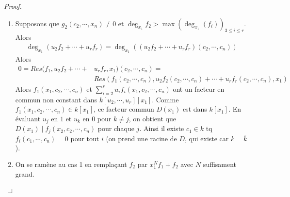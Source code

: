 \begin{proof}
                    \begin{enumerate}
                        \item Supposons que $g_2(c_2, \cdots, x_n) \neq 0$ et $\deg_{x_1} f_2 > \max(\deg_{x_1}(f_i))_{3 \leq i \leq r}$. Alors
                        \begin{align*}
                            \deg_{x_1}(u_2f_2 + \cdots + u_rf_r) = \deg_{x_1}((u_2f_2 + \cdots + u_rf_r)(c_2, \cdots, c_n))
                        \end{align*}
                        Alors 
                        \begin{align*}
                            0 = Res(f_1, u_2f_2 + \cdots + &u_rf_r, x_1)(c_2, \cdots, c_n) = \\
                            &Res(f_1(c_2, \cdots, c_n), u_2f_2(c_2, \cdots, c_n) + \cdots + u_rf_r(c_2, \cdots, c_n), x_1)
                        \end{align*}
                        Alors $f_1(x_1, c_2, \cdots, c_n)$ et $\sum_{i = 2}^r u_if_i(x_1, c_2, \cdots, c_n)$ ont un facteur en commun non constant dans $k[u_2, \cdots, u_r][x_1]$. Comme $f_1(x_1, c_2, \cdots, c_n) \in k[x_1]$, ce facteur commun $D(x_1)$ est dans $k[x_1]$. En évaluant $u_j$ en $1$ et $u_k$ en $0$ pour $k \neq j$, on obtient que $D(x_1) \mid f_j(x_2, c_2, \cdots, c_n)$ pour chaque $j$. Ainsi il existe $c_1 \in k$ tq $f_i(c_1, \cdots, c_n) = 0$ pour tout $i$ (on prend une racine de $D$, qui existe car $k = \bar k$).
                        \item On se ramène au cas 1 en remplaçant $f_2$ par $x_1^Nf_1 + f_2$ avec $N$ suffisament grand.
                    \end{enumerate}
                \end{proof}

